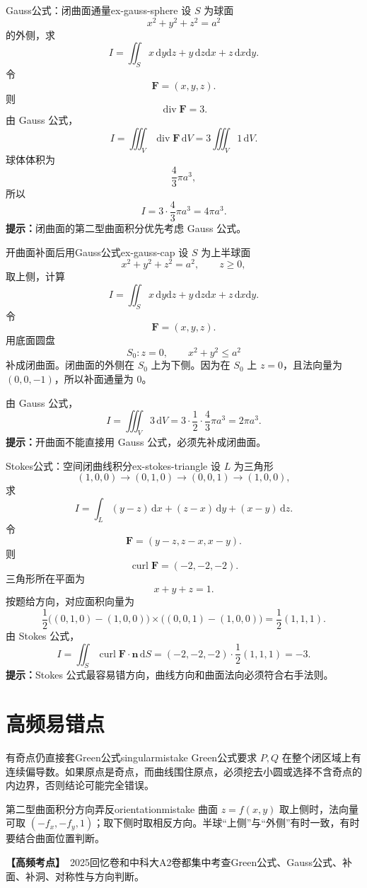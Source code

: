 \documentclass[UTF8,zihao=-4,openany]{ctexbook}
\newcommand{\examkey}{\textcolor{warnred}{\bfseries【高频考点】}}
\begin{document}
\begin{example}{Gauss公式：闭曲面通量}{ex-gauss-sphere}
设 $S$ 为球面
\[
  x^2+y^2+z^2=a^2
\]
的外侧，求
\[
  I=\iint_S x\,\mathrm{d}y\mathrm{d}z+y\,\mathrm{d}z\mathrm{d}x+z\,\mathrm{d}x\mathrm{d}y.
\]
\tcblower
令
\[
  \mathbf F=(x,y,z).
\]
则
\[
  \operatorname{div}\mathbf F=3.
\]
由 Gauss 公式，
\[
  I=\iiint_V\operatorname{div}\mathbf F\,\mathrm{d}V
  =3\iiint_V1\,\mathrm{d}V.
\]
球体体积为
\[
  \frac{4}{3}\pi a^3,
\]
所以
\[
  I=3\cdot\frac{4}{3}\pi a^3=4\pi a^3.
\]
\textbf{提示：}闭曲面的第二型曲面积分优先考虑 Gauss 公式。
\end{example}

\begin{example}{开曲面补面后用Gauss公式}{ex-gauss-cap}
设 $S$ 为上半球面
\[
  x^2+y^2+z^2=a^2,\qquad z\geq0,
\]
取上侧，计算
\[
  I=\iint_S x\,\mathrm{d}y\mathrm{d}z+y\,\mathrm{d}z\mathrm{d}x+z\,\mathrm{d}x\mathrm{d}y.
\]
\tcblower
令
\[
  \mathbf F=(x,y,z).
\]
用底面圆盘
\[
  S_0:z=0,\qquad x^2+y^2\leq a^2
\]
补成闭曲面。闭曲面的外侧在 $S_0$ 上为下侧。因为在 $S_0$ 上 $z=0$，且法向量为 $(0,0,-1)$，所以补面通量为 $0$。

由 Gauss 公式，
\[
  I=\iiint_V3\,\mathrm{d}V
  =3\cdot\frac12\cdot\frac{4}{3}\pi a^3
  =2\pi a^3.
\]
\textbf{提示：}开曲面不能直接用 Gauss 公式，必须先补成闭曲面。
\end{example}

\begin{example}{Stokes公式：空间闭曲线积分}{ex-stokes-triangle}
设 $L$ 为三角形
\[
  (1,0,0)\to(0,1,0)\to(0,0,1)\to(1,0,0),
\]
求
\[
  I=\int_L (y-z)\,\mathrm{d}x+(z-x)\,\mathrm{d}y+(x-y)\,\mathrm{d}z.
\]
\tcblower
令
\[
  \mathbf F=(y-z,z-x,x-y).
\]
则
\[
  \operatorname{curl}\mathbf F=(-2,-2,-2).
\]
三角形所在平面为
\[
  x+y+z=1.
\]
按题给方向，对应面积向量为
\[
  \frac12\bigl((0,1,0)-(1,0,0)\bigr)\times\bigl((0,0,1)-(1,0,0)\bigr)
  =
  \frac12(1,1,1).
\]
由 Stokes 公式，
\[
  I=\iint_S\operatorname{curl}\mathbf F\cdot \mathbf n\,\mathrm{d}S
  =
  (-2,-2,-2)\cdot\frac12(1,1,1)
  =
  -3.
\]
\textbf{提示：}Stokes 公式最容易错方向，曲线方向和曲面法向必须符合右手法则。
\end{example}



\section{高频易错点}
\begin{mistake}{有奇点仍直接套Green公式}{singularmistake}
Green公式要求 $P,Q$ 在整个闭区域上有连续偏导数。如果原点是奇点，而曲线围住原点，必须挖去小圆或选择不含奇点的内边界，否则结论可能完全错误。
\end{mistake}
\begin{mistake}{第二型曲面积分方向弄反}{orientationmistake}
曲面 $z=f(x,y)$ 取上侧时，法向量可取 $(-f_x,-f_y,1)$；取下侧时取相反方向。半球“上侧”与“外侧”有时一致，有时要结合曲面位置判断。
\end{mistake}
\examkey\ 2025回忆卷和中科大A2卷都集中考查Green公式、Gauss公式、补面、补洞、对称性与方向判断。
\end{document}
